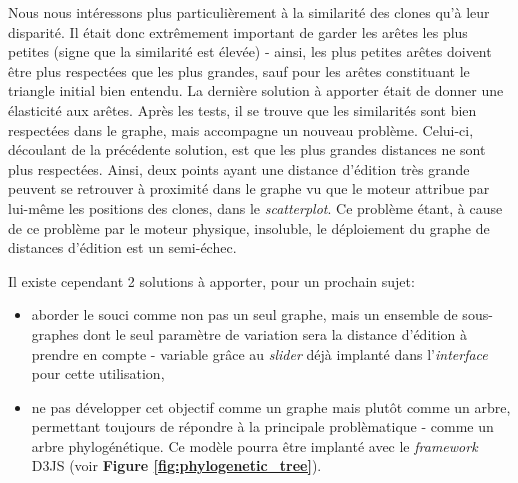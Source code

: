 \documentclass[pdftex,12pt,a4paper]{report}
\begin{document}
\begin{spacing}{1.2}
Nous nous intéressons plus particulièrement à la similarité des clones qu'à leur disparité. Il était donc extrêmement important de garder les arêtes les plus petites (signe que la similarité est élevée) - ainsi, les plus petites arêtes doivent être plus respectées que les plus grandes, sauf pour les arêtes constituant le triangle initial bien entendu. La dernière solution à apporter était de donner une élasticité aux arêtes. Après les tests, il se trouve que les similarités sont bien respectées dans le graphe, mais accompagne un nouveau problème. Celui-ci, découlant de la précédente solution, est que les plus grandes distances ne sont plus respectées. Ainsi, deux points ayant une distance d'édition très grande peuvent se retrouver à proximité dans le graphe vu que le moteur attribue par lui-même les positions des clones, dans le \textit{scatterplot}. Ce problème étant, à cause de ce problème par le moteur physique, insoluble, le déploiement du graphe de distances d'édition est un semi-échec.

Il existe cependant 2 solutions à apporter, pour un prochain sujet:
\begin{itemize}
\item{aborder le souci comme non pas un seul graphe, mais un ensemble de sous-graphes dont le seul paramètre de variation sera la distance d'édition à prendre en compte - variable grâce au \textit{slider} déjà implanté dans l'\textit{interface} pour cette utilisation,}
\item{ne pas développer cet objectif comme un graphe mais plutôt comme un arbre, permettant toujours de répondre à la principale problèmatique - comme un arbre phylogénétique. Ce modèle pourra être implanté avec le \textit{framework} D3JS (voir \textbf{Figure \ref{fig:phylogenetic_tree}}).}
\end{itemize}


\end{spacing}
\end{document}
